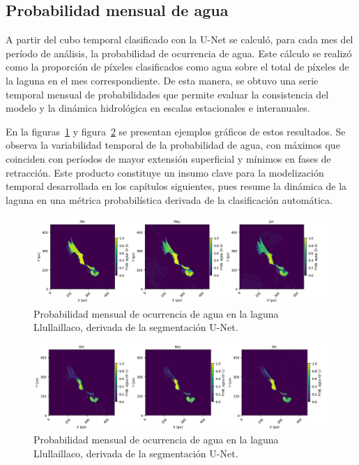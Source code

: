 \subsection{Probabilidad mensual de agua}

A partir del cubo temporal clasificado con la U-Net se calculó, para cada mes del período de análisis, la probabilidad de ocurrencia de agua. Este cálculo se realizó como la proporción de píxeles clasificados como agua sobre el total de píxeles de la laguna en el mes correspondiente. De esta manera, se obtuvo una serie temporal mensual de probabilidades que permite evaluar la consistencia del modelo y la dinámica hidrológica en escalas estacionales e interanuales.

En la figuras~\ref{fig:prob_agua_mensual} y figura~\ref{fig:prob_agua_mensual2} se presentan ejemplos gráficos de estos resultados. Se observa la variabilidad temporal de la probabilidad de agua, con máximos que coinciden con períodos de mayor extensión superficial y mínimos en fases de retracción. Este producto constituye un insumo clave para la modelización temporal desarrollada en los capítulos siguientes, pues resume la dinámica de la laguna en una métrica probabilística derivada de la clasificación automática.

\begin{figure}[H]
    \centering
    \includegraphics[scale=0.31]{Figures/prob_agua1.png}
    \caption{Probabilidad mensual de ocurrencia de agua en la laguna Llullaillaco, derivada de la segmentación U-Net.}
    \label{fig:prob_agua_mensual}
\end{figure}

\begin{figure}[H]
    \centering
    \includegraphics[scale=0.31]{Figures/prob_agua2.png}
    \caption{Probabilidad mensual de ocurrencia de agua en la laguna Llullaillaco, derivada de la segmentación U-Net.}
    \label{fig:prob_agua_mensual2}
\end{figure}


